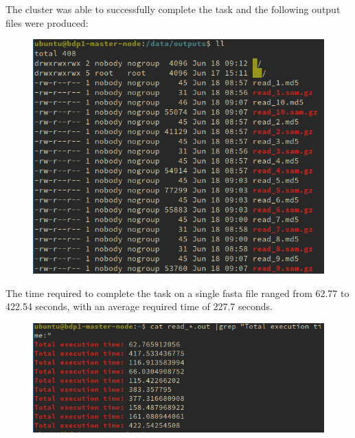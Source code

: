 \documentclass{article}
\begin{document}
The cluster was able to successfully complete the task and the following output files were produced:

\begin{figure}[!h]
    \center
    \includegraphics[width=\textwidth]{./images/condor_test_out.png}
\end{figure}
\FloatBarrier

The time required to complete the task on a single fasta file ranged from 62.77 to 422.54 seconds, with an average required time of 227.7 seconds.

\begin{figure}[!h]
    \center
    \includegraphics[width=\textwidth]{./images/time_condor.png}
\end{figure}
\FloatBarrier
\end{document}
